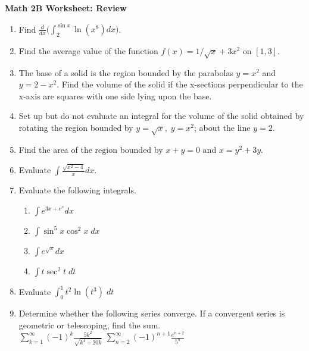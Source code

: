 \documentclass[12pt,fleqn]{article}
\begin{document}
\begin{center}
	\textbf{Math 2B Worksheet: Review}
\end{center}



\begin{enumerate}
\item  Find $\displaystyle\frac{d}{dx}\bigg(\int_2^{\sin x}\ln(x^8)dx\bigg)$.
\vspace{2in}
\item Find the average value of the function $f(x)=1/\sqrt{x}+3x^2$ on $[1,3]$.
\vspace{2in}
\item The base of a solid is the region bounded by the parabolas $y=x^2$ and $y=2-x^2$.  Find the volume of the solid if the x-sections perpendicular to the x-axis are squares with one side lying upon the base.
\newpage
\item  Set up but do not evaluate an integral for the volume of the solid obtained by rotating the region bounded by $y=\sqrt{x},\; y=x^2$; about the line $y=2$.\\
\vspace{2.5in}
\item Find the area of the region bounded by $x+y=0$ and $x=y^2+3y$.  
\vspace{2.5in}
\item Evaluate $\displaystyle\int\frac{\sqrt{x^2-4}}{x}dx$.
\newpage
\item Evaluate the following integrals.
\begin{enumerate}
	\item $\displaystyle\int e^{3x+e^x}dx$\\
	\vspace{2in}
	\item $\displaystyle\int\sin^5x\cos^2x\;dx$\\
	\vspace{2in}
	\item $\displaystyle\int e^{\sqrt{x}}dx$\\
	\vspace{2in}
	\item $\displaystyle\int t\sec^2t\;dt$\\	
\end{enumerate}

\newpage
\item Evaluate $\int_0^1 t^2\ln(t^3)\;dt$\\
\vspace{3in}
\item Determine whether the following series converge.  If a convergent series is geometric or telescoping, find the sum.\\

$\displaystyle\sum_{k=1}^\infty (-1)^k\frac{5k^2}{\sqrt{k^4+20k}}$
\hspace{2in}
$\displaystyle \sum_{n=2}^\infty (-1)^{n+1}\frac{e^{n+2}}{5^n}$



\end{enumerate}
\end{document}
